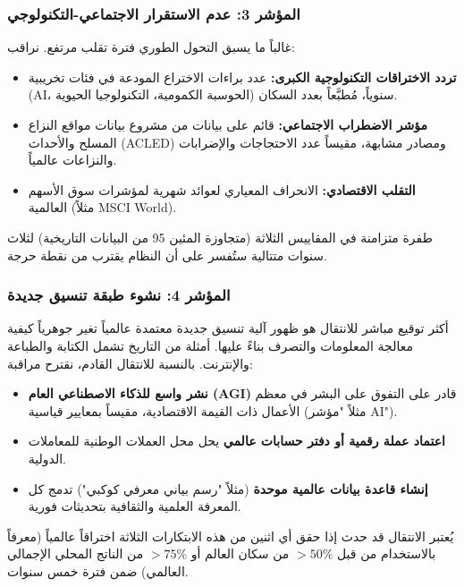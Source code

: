 \documentclass[11pt,a4paper]{article}
\begin{document}
	\subsubsection{المؤشر 3: عدم الاستقرار الاجتماعي-التكنولوجي}
	
	غالباً ما يسبق التحول الطوري فترة تقلب مرتفع. نراقب:
	
	\begin{itemize}
		\item \textbf{تردد الاختراقات التكنولوجية الكبرى:} عدد براءات الاختراع المودعة في فئات تخريبية (AI، الحوسبة الكمومية، التكنولوجيا الحيوية) سنوياً، مُطبَّعاً بعدد السكان.
		\item \textbf{مؤشر الاضطراب الاجتماعي:} قائم على بيانات من مشروع بيانات مواقع النزاع المسلح والأحداث (ACLED) ومصادر مشابهة، مقيساً عدد الاحتجاجات والإضرابات والنزاعات عالمياً.
		\item \textbf{التقلب الاقتصادي:} الانحراف المعياري لعوائد شهرية لمؤشرات سوق الأسهم العالمية (مثلاً MSCI World).
	\end{itemize}
	
	طفرة متزامنة في المقاييس الثلاثة (متجاوزة المئين 95 من البيانات التاريخية) لثلاث سنوات متتالية ستُفسر على أن النظام يقترب من نقطة حرجة.
	
	\subsubsection{المؤشر 4: نشوء طبقة تنسيق جديدة}
	
	أكثر توقيع مباشر للانتقال هو ظهور آلية تنسيق جديدة معتمدة عالمياً تغير جوهرياً كيفية معالجة المعلومات والتصرف بناءً عليها. أمثلة من التاريخ تشمل الكتابة والطباعة والإنترنت. بالنسبة للانتقال القادم، نقترح مراقبة:
	
	\begin{itemize}
		\item \textbf{نشر واسع للذكاء الاصطناعي العام (AGI)} قادر على التفوق على البشر في معظم الأعمال ذات القيمة الاقتصادية، مقيساً بمعايير قياسية (مثلاً "مؤشر AI").
		\item \textbf{اعتماد عملة رقمية أو دفتر حسابات عالمي} يحل محل العملات الوطنية للمعاملات الدولية.
		\item \textbf{إنشاء قاعدة بيانات عالمية موحدة} (مثلاً "رسم بياني معرفي كوكبي") تدمج كل المعرفة العلمية والثقافية بتحديثات فورية.
	\end{itemize}
	
	يُعتبر الانتقال قد حدث إذا حقق أي اثنين من هذه الابتكارات الثلاثة اختراقاً عالمياً (معرفاً بالاستخدام من قبل \(>50\%\) من سكان العالم أو \(>75\%\) من الناتج المحلي الإجمالي العالمي) ضمن فترة خمس سنوات.
	
\end{document}
